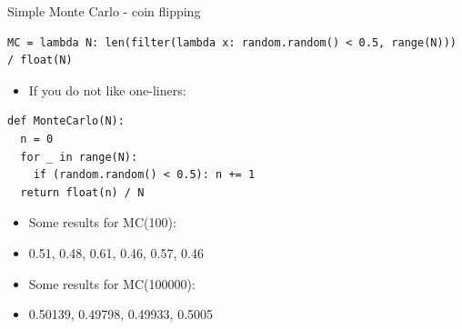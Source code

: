 \begin{wideslide}[toc = Simple Monte Carlo, method=direct]{Simple Monte Carlo - coin flipping}
  {\small\color{pdcolor3}
  \begin{verbatim}
MC = lambda N: len(filter(lambda x: random.random() < 0.5, range(N))) / float(N)     
  \end{verbatim}
  }
  \begin{minipage}{0.55\textwidth}
  \begin{itemize}
   \item If you do not like one-liners:
  \end{itemize}
  \vspace{-20pt}  
  {\small\color{pdcolor3}
  \begin{verbatim}
def MonteCarlo(N):
  n = 0
  for _ in range(N):
    if (random.random() < 0.5): n += 1
  return float(n) / N   
  \end{verbatim}
  }
  \end{minipage}\begin{minipage}{0.45\textwidth}
		  \vspace{-10pt}
		  \begin{itemize}
		   \item Some results for MC(100):
		   \item[]
		   0.51, 0.48, 0.61, 0.46, 0.57, 0.46
		   \item Some results for MC(100000):
		   \item[]
		   0.50139, 0.49798, 0.49933, 0.5005
		  \end{itemize}
                \end{minipage}

\vfill\null
\end{wideslide}


